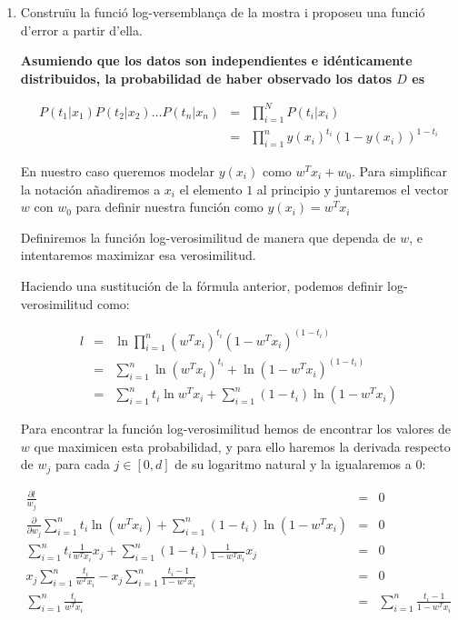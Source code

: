 \documentclass[a4paper]{article}
\begin{document}
\begin{enumerate}
  \item Construïu la funció log-versemblança de la mostra i proposeu una funció d'error a partir d'ella.

  {\bfseries
  Asumiendo que los datos son independientes e idénticamente distribuidos, la probabilidad de haber observado los datos $D$ es

  \begin{eqnarray*}
    P(t_1 | x_1 )P(t_2 | x_2 )\dots P(t_n | x_n ) &=& \prod_{i = 1}^{N} P(t_i | x_i ) \\
    &=& \prod_{i = 1}^{n} y(x_i)^{t_i} (1 - y(x_i))^{1-t_i}
  \end{eqnarray*}

  En nuestro caso queremos modelar $y(x_i)$ como $w^Tx_i + w_0$. Para simplificar la notación añadiremos a $x_i$ el elemento $1$ al principio y juntaremos el vector $w$ con $w_0$ para definir nuestra función como $y(x_i) = w^Tx_i$

  Definiremos la función log-verosimilitud de manera que dependa de $w$, e intentaremos maximizar esa verosimilitud.

  Haciendo una sustitución de la fórmula anterior, podemos definir log-verosimilitud como:

  \begin{eqnarray*}
    l
    &=& \ln
    \prod_{i = 1}^{n}
    (w^Tx_i)^{t_i}
    (1 - w^Tx_i)^{(1 - t_i)} \\
    &=&
    \sum_{i = 1}^{n} \ln(w^Tx_i)^{t_i} + \ln (1 - w^Tx_i)^{(1 - t_i)} \\
    &=&
    \sum_{i = 1}^{n} t_i \ln w^Tx_i
    +
    \sum_{i = 1}^{n} (1 - t_i)\ln(1 - w^Tx_i)
  \end{eqnarray*}

  Para encontrar la función log-verosimilitud hemos de encontrar los valores de
  $w$ que maximicen esta probabilidad, y para ello haremos la derivada respecto
  de $w_j$ para cada $j \in [0, d]$ de su logaritmo
  natural y la igualaremos a $0$:

  \begin{eqnarray*}
    \frac{\partial l}{w_j} &=& 0 \\
%
    \frac{\partial}{\partial w_j}
    \sum_{i = 1}^{n} t_i \ln (w^Tx_i)
    +
    \sum_{i = 1}^{n} (1 - t_i)\ln(1 - w^Tx_i)
    &=& 0\\
    \sum_{i = 1}^{n} t_i \frac{1}{w^Tx_i} x_j
    +
    \sum_{i = 1}^{n} (1 - t_i) \frac{1}{1 - w^Tx_i} x_j
    &=& 0\\
    x_j\sum_{i = 1}^{n}  \frac{t_i}{w^Tx_i}
    -
    x_j\sum_{i = 1}^{n} \frac{t_i - 1}{1 - w^Tx_i}
    &=& 0\\
    \sum_{i = 1}^{n}  \frac{t_i}{w^Tx_i}
    &=&
    \sum_{i = 1}^{n} \frac{t_i - 1}{1 - w^Tx_i} \\
  \end{eqnarray*}

}
\end{enumerate}
\end{document}

